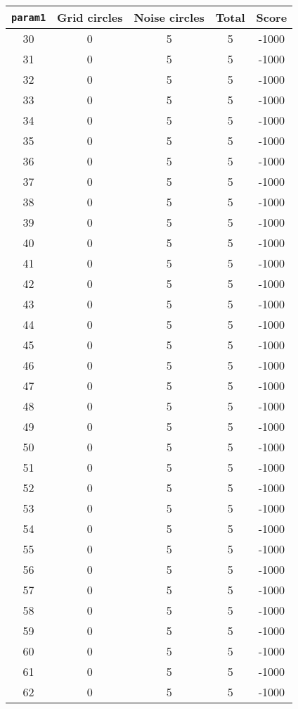 \documentclass[letterpaper, 12pt]{article}
\begin{document}
\begin{longtable}{|c|c|c|c|c|}
\hline
\textbf{\texttt{param1}} & \textbf{Grid circles} & \textbf{Noise circles} & \textbf{Total} & \textbf{Score} \\
\hline
30 & 0 & 5 & 5 & -1000 \\
\hline
31 & 0 & 5 & 5 & -1000 \\
\hline
32 & 0 & 5 & 5 & -1000 \\
\hline
33 & 0 & 5 & 5 & -1000 \\
\hline
34 & 0 & 5 & 5 & -1000 \\
\hline
35 & 0 & 5 & 5 & -1000 \\
\hline
36 & 0 & 5 & 5 & -1000 \\
\hline
37 & 0 & 5 & 5 & -1000 \\
\hline
38 & 0 & 5 & 5 & -1000 \\
\hline
39 & 0 & 5 & 5 & -1000 \\
\hline
40 & 0 & 5 & 5 & -1000 \\
\hline
41 & 0 & 5 & 5 & -1000 \\
\hline
42 & 0 & 5 & 5 & -1000 \\
\hline
43 & 0 & 5 & 5 & -1000 \\
\hline
44 & 0 & 5 & 5 & -1000 \\
\hline
45 & 0 & 5 & 5 & -1000 \\
\hline
46 & 0 & 5 & 5 & -1000 \\
\hline
47 & 0 & 5 & 5 & -1000 \\
\hline
48 & 0 & 5 & 5 & -1000 \\
\hline
49 & 0 & 5 & 5 & -1000 \\
\hline
50 & 0 & 5 & 5 & -1000 \\
\hline
51 & 0 & 5 & 5 & -1000 \\
\hline
52 & 0 & 5 & 5 & -1000 \\
\hline
53 & 0 & 5 & 5 & -1000 \\
\hline
54 & 0 & 5 & 5 & -1000 \\
\hline
55 & 0 & 5 & 5 & -1000 \\
\hline
56 & 0 & 5 & 5 & -1000 \\
\hline
57 & 0 & 5 & 5 & -1000 \\
\hline
58 & 0 & 5 & 5 & -1000 \\
\hline
59 & 0 & 5 & 5 & -1000 \\
\hline
60 & 0 & 5 & 5 & -1000 \\
\hline
61 & 0 & 5 & 5 & -1000 \\
\hline
62 & 0 & 5 & 5 & -1000 \\

\end{longtable}
\end{document}
